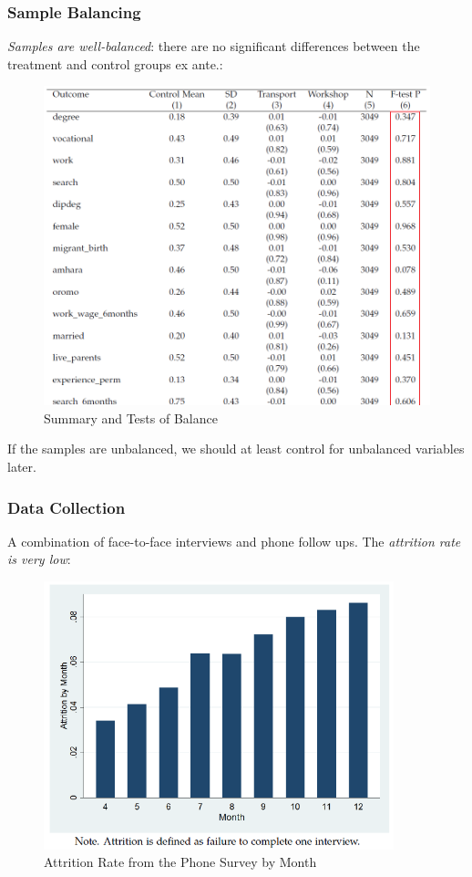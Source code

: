         \subsubsection{Sample Balancing}
            \emph{Samples are well-balanced}: there are no significant differences between the treatment and control groups ex ante.:
            \begin{figure}[H]
                \centering
                \includegraphics[width=5in]{images/ch6/Abebe balancing.png}
                \caption{Summary and Tests of Balance}
            \end{figure}
            If the samples are unbalanced, we should at least control for unbalanced variables later.
            
        \subsubsection{Data Collection}
            A combination of face-to-face interviews and phone follow ups. The \emph{attrition rate is very low}:
            \begin{figure}[H]
                \centering
                \includegraphics[width=4in]{images/ch6/Abebe attrition.png}
                \caption{Attrition Rate from the Phone Survey by Month}
            \end{figure}

